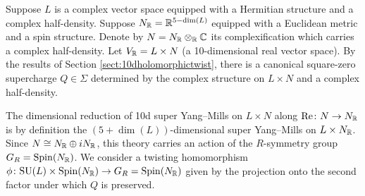 \documentclass[10pt, oneside]{article}
\renewcommand{\Re}{\mathrm{Re}}
\begin{document}
Suppose $L$ is a complex vector space equipped with a Hermitian structure and a complex half-density. Suppose $N_\mathbb R=\mathbb R^{5-\dim(L)}$ equipped with a Euclidean metric and a spin structure. Denote by $N=N_\mathbb R\otimes_\mathbb R\mathbb C$ its complexification which carries a complex half-density. Let $V_\mathbb R = L\times N$ (a 10-dimensional real vector space). By the results of Section \ref{sect:10dholomorphictwist}, there is a canonical square-zero supercharge $Q\in\Sigma$ determined by the complex structure on $L\times N$ and a complex half-density.

The dimensional reduction of 10d super Yang--Mills on $L\times N$ along $\Re\colon N\rightarrow N_\RR$ is by definition the $(5+\dim(L))$-dimensional super Yang--Mills on $L\times N_\mathbb R$. Since $N\cong N_\mathbb R\oplus iN_\mathbb R$, this theory carries an action of the $R$-symmetry group $G_R=\mathrm{Spin}(N_\mathbb R)$. We consider a twisting homomorphism $\phi\colon \mathrm{SU}(L)\times \mathrm{Spin}(N_\mathbb R)\rightarrow G_R=\mathrm{Spin}(N_\mathbb R)$ given by the projection onto the second factor under which $Q$ is preserved.
\end{document}

